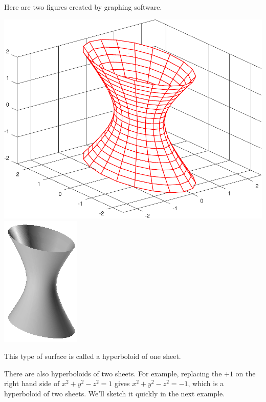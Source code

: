 \begin{eg}[$4x^2+y^2-z^2=1$]
\begin{efig}
\begin{center}
\end{center}
\end{efig}
Here are two figures created by graphing software.
\begin{efig}
\begin{center}
   \includegraphics[scale=0.43]{hyperboloid1sheet.pdf}\qquad\qquad
   \includegraphics[scale=1.3]{hyperboloid1sheetDD.pdf}
\end{center}
\end{efig}
This type of surface is called a hyperboloid of one sheet.

There are also hyperboloids of two sheets. For example, replacing the $+1$
on the right hand side of $x^2+y^2-z^2=1$ gives $x^2+y^2-z^2=-1$, which is
a hyperboloid of two sheets. We'll sketch it quickly in the next example. 
\end{eg}

